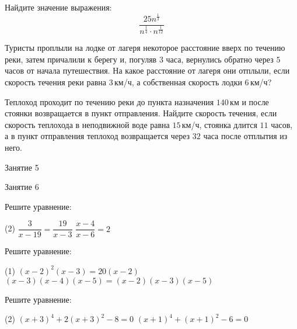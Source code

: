 \begin{homework}[number=2]
	\begin{listofex}
		\item Найдите значение выражения: \[ \dfrac{25n^{\frac{1}{3}}}{n^{\frac{1}{4}}\cdot n^{\frac{1}{12}}} \]
		\item Туристы проплыли на лодке от лагеря некоторое расстояние вверх по течению реки, затем причалили к берегу и, погуляв \( 3 \) часа, вернулись обратно через \( 5 \) часов от начала путешествия. На какое расстояние от лагеря они отплыли, если скорость течения реки равна \( 3 \) км/ч, а собственная скорость лодки \( 6 \) км/ч?
		\item Теплоход проходит по течению реки до пункта назначения \( 140 \) км и после стоянки возвращается в пункт отправления. Найдите скорость течения, если скорость теплохода в неподвижной воде равна \( 15 \) км/ч, стоянка длится \( 11 \) часов, а в пункт отправления теплоход возвращается через \( 32 \) часа после отплытия из него.
	\end{listofex}
\end{homework}

\begin{class}[number=5]
	\begin{listofex}
		\item Занятие 5
	\end{listofex}
\end{class}

\begin{class}[number=6]
	\begin{listofex}
		\item Занятие 6
	\end{listofex}
\end{class}

\begin{homework}[number=4]
	\begin{listofex}
		\item Решите уравнение:
		\begin{tasks}(2)
			\task \( \dfrac{3}{x-19}=\dfrac{19}{x-3} \)
			\task \( \dfrac{x-4}{x-6}=2 \)
		\end{tasks}
		\item Решите уравнение:
		\begin{tasks}(1)
			\task \( (x-2)^{2}(x-3)=20(x-2) \)
			\task \( (x-3)(x-4)(x-5)=(x-2)(x-3)(x-5) \)
		\end{tasks}
		\item Решите уравнение:
		\begin{tasks}(2)
			\task \( (x+3)^{4}+2(x+3)^{2}-8=0 \)
			\task \( (x+1)^{4}+(x+1)^{2}-6=0 \)
		\end{tasks}
	\end{listofex}
\end{homework}

